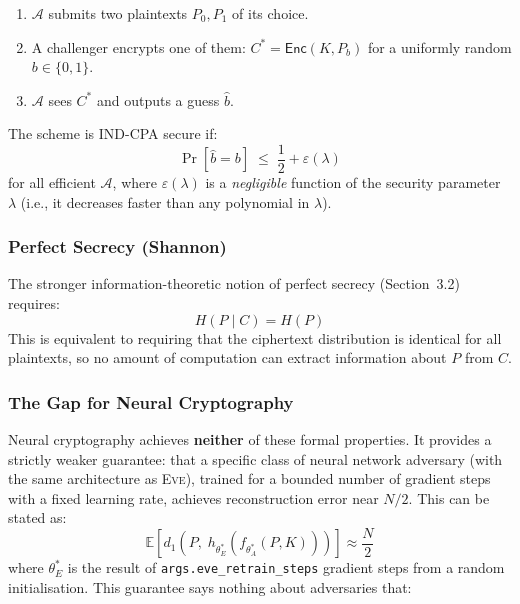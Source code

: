 \documentclass[12pt, a4paper]{article}
\newcommand{\eve}{\textsc{Eve}}
\newcommand{\thetaA}{\theta_{\!A}}
\newcommand{\thetaE}{\theta_{\!E}}
\newcommand{\code}[1]{\texttt{\color{CodeRed}#1}}
\begin{document}
\begin{enumerate}[leftmargin=2em, itemsep=3pt]
  \item $\mathcal{A}$ submits two plaintexts $P_0, P_1$ of its choice.
  \item A challenger encrypts one of them: $C^* = \mathsf{Enc}(K, P_b)$
        for a uniformly random $b \in \{0,1\}$.
  \item $\mathcal{A}$ sees $C^*$ and outputs a guess $\hat{b}$.
\end{enumerate}

\noindent The scheme is IND-CPA secure if:
%
\begin{equation}
  \Pr[\hat{b} = b] \;\leq\; \frac{1}{2} + \varepsilon(\lambda)
  \label{eq:ind_cpa}
\end{equation}
%
for all efficient $\mathcal{A}$, where $\varepsilon(\lambda)$ is a
\emph{negligible} function of the security parameter $\lambda$ (i.e.,
it decreases faster than any polynomial in $\lambda$).

\subsubsection*{Perfect Secrecy (Shannon)}

The stronger information-theoretic notion of perfect secrecy
(Section~3.2) requires:
%
\begin{equation}
  H(P \mid C) = H(P)
  \label{eq:perfect_secrecy_again}
\end{equation}
%
This is equivalent to requiring that the ciphertext distribution is
identical for all plaintexts, so no amount of computation can extract
information about $P$ from $C$.

\subsubsection*{The Gap for Neural Cryptography}

Neural cryptography achieves \textbf{neither} of these formal properties.
It provides a strictly weaker guarantee: that a specific class of neural
network adversary (with the same architecture as \eve{}), trained for a
bounded number of gradient steps with a fixed learning rate, achieves
reconstruction error near $N/2$. This can be stated as:
%
\begin{equation}
  \mathbb{E}\!\left[
    d_1\!\left(P,\; h_{\thetaE^*}\!\left(f_{\thetaA^*}(P,K)\right)\right)
  \right]
  \approx \frac{N}{2}
  \label{eq:neural_security_claim}
\end{equation}
%
where $\thetaE^*$ is the result of \code{args.eve\_retrain\_steps}
gradient steps from a random initialisation. This guarantee says nothing
about adversaries that:
\end{document}
